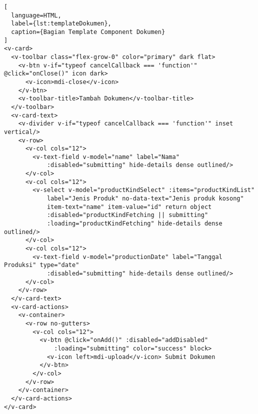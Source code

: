 \begin{lstlisting}[
  language=HTML,
  label={lst:templateDokumen},
  caption={Bagian Template Component Dokumen}
]
<v-card>
  <v-toolbar class="flex-grow-0" color="primary" dark flat>
    <v-btn v-if="typeof cancelCallback === 'function'" @click="onClose()" icon dark>
      <v-icon>mdi-close</v-icon>
    </v-btn>
    <v-toolbar-title>Tambah Dokumen</v-toolbar-title>
  </v-toolbar>
  <v-card-text>
    <v-divider v-if="typeof cancelCallback === 'function'" inset vertical/>
    <v-row>
      <v-col cols="12">
        <v-text-field v-model="name" label="Nama"
            :disabled="submitting" hide-details dense outlined/>
      </v-col>
      <v-col cols="12">
        <v-select v-model="productKindSelect" :items="productKindList"
            label="Jenis Produk" no-data-text="Jenis produk kosong"
            item-text="name" item-value="id" return object
            :disabled="productKindFetching || submitting"
            :loading="productKindFetching" hide-details dense outlined/>
      </v-col>
      <v-col cols="12">
        <v-text-field v-model="productionDate" label="Tanggal Produksi" type="date"
            :disabled="submitting" hide-details dense outlined/>
      </v-col>
    </v-row>
  </v-card-text>
  <v-card-actions>
    <v-container>
      <v-row no-gutters>
        <v-col cols="12">
          <v-btn @click="onAdd()" :disabled="addDisabled"
              :loading="submitting" color="success" block>
            <v-icon left>mdi-upload</v-icon> Submit Dokumen
          </v-btn>
        </v-col>
      </v-row>
    </v-container>
  </v-card-actions>
</v-card>
\end{lstlisting}
\vspace{0.5ex}

